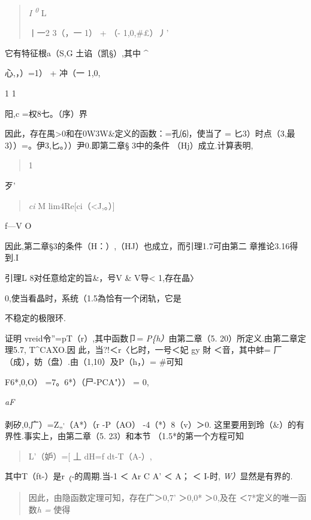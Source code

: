 \documentclass{article}
\begin{document}
\begin{quote}
\emph{I \textsuperscript{0}} L \textbar{}

丨一2 3（，一 1） + （- 1,0,\#£）丿'
\end{quote}

它有特征根a（S,G 土谄（凯§）,其中 \^{}

心,，）=1） + 冲（一 1,0,

1 1

阳,c =权8七。（序）界

因此，存在禺\textgreater{}0和在0W3W\&定义的函数：=孔⑹，使当了 =
匕3）时点（3,最3））=。伊3,匕。））尹0.即第二章§ 3中的条件
（Hj）成立.计算表明,

\begin{quote}
1
\end{quote}

歹'

\begin{quote}
\emph{ci} M lim4Re{[}ci（\textless{}J,。）{]}
\end{quote}

f---V O

因此,第二章§3的条件（H：）,（HJ）也成立，而引理1.7可由第二
章推论3.16得到.I

引理L 8对任意给定的旨\&，号V \& V导\textless{} 1,存在晶〉

0,使当看晶时，系统（1.5為恰有一个闭轨，它是

不稳定的极限环.

证明 vreid令''=pT（r）,其中函数卩= \emph{P\{h）}由第二章（5.
20）所定义.由第二章定理5.7, T\^{}CAXO.因 此，当?!＜r〈匕时，一号＜妃 gy
財 ＜音，其中蚌= 厂（成），妨（盘）.由（1,10）及P（h，）= \#可知

F6*,0,O） =7。6*）（尸-PCA"）） = 0,

\emph{aF}

剥矽,0,广）=Z„\textsuperscript{,}（A*）（r -P（AO） -4（*）8（v）＞0.
这里要用到玲（\&）的有界性.事实上，由第二章（5. 23）和本节
（1.5*的第一个方程可知

\begin{quote}
L'（妒）={[} 丄 dH=f dt-T（A-）,
\end{quote}

其中T（ft-）是r\textsubscript{（}-的周期.当-1 ＜ Ar C A' ＜ A； ＜ I-时,
\emph{W）}显然是有界的.

\begin{quote}
因此，由隐函数定理可知，存在广＞0,7' ＞0,0* ＞0,及在
\textbar{}＜7*定义的唯一函数\emph{h =} 使得
\end{quote}
\end{document}
